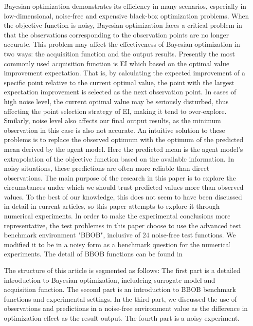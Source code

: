 \documentclass{article}
\begin{document}
\hspace{2em}
Bayesian optimization demonstrates its efficiency in many scenarios, especially in low-dimensional, noise-free and expensive black-box optimization problems. When the objective function is noisy, Bayesian optimization faces a critical problem in that the observations corresponding to the observation points are no longer accurate. This problem may affect the effectiveness of Bayesian optimization in two ways: the acquisition function and the output results. Presently the most commonly used acquisition function is EI \citep{Jones1998Efficient} which based on the optimal value improvement expectation. That is, by calculating the expected improvement of a specific point relative to the current optimal value, the point with the largest expectation improvement is selected as the next observation point. In cases of high noise level, the current optimal value may be seriously disturbed, thus affecting the point selection strategy of EI, making it tend to over-explore. Smilarly, noise level also affects our final output results, as the minimum observation in this case is also not accurate. An intuitive solution to these problems is to replace the observed optimum with the optimum of the predicted mean derived by the agent model. Here the predicted mean is the agent model's extrapolation of the objective function based on the available information. In noisy situations, these predictions are often more reliable than direct observations. The main purpose of the research in this paper is to explore the circumstances under which we should trust predicted values more than observed values. To the best of our knowledge, this does not seem to have been discussed in detail in current articles, so this paper attempts to explore it through numerical experiments. In order to make the experimental conclusions more representative, the test problemss in this paper choose to use the advanced test benchmark environment "BBOB",  inclusive of 24 noise-free test functions. We modified it to be in a noisy form as a benchmark question for the numerical experiments. The detail of BBOB functions can be found in \citep{Hansen2010RealParameterBO}

\hspace{2em}
The structure of this article is segmented as follows: The first part is a detailed introduction to Bayesian optimization, includeing surrogate model and acquisition function. The second part is an introduction to BBOB benchmark functions and experimental settings. In the third part, we discussed the use of observations and predictions in a noise-free environment value as the difference in optimization effect as the result output. The fourth part is a noisy experiment. 
\end{document}

